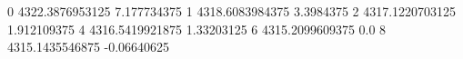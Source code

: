 0 4322.3876953125 7.177734375
1 4318.6083984375 3.3984375
2 4317.1220703125 1.912109375
4 4316.5419921875 1.33203125
6 4315.2099609375 0.0
8 4315.1435546875 -0.06640625
